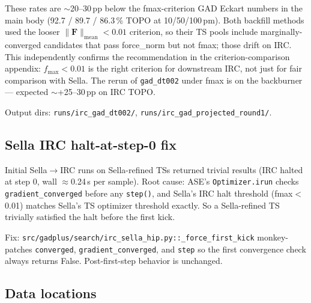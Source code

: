 \documentclass[11pt]{article}
\begin{document}
These rates are $\sim$20--30\,pp below the fmax-criterion GAD Eckart numbers
in the main body (92.7 / 89.7 / 86.3\,\% TOPO at 10/50/100\,pm). Both
backfill methods used the looser $\|\mathbf{F}\|_{\text{mean}}{<}0.01$
criterion, so their TS pools include marginally-converged candidates that
pass force\_norm but not fmax; those drift on IRC. This independently
confirms the recommendation in the criterion-comparison appendix:
$f_{\max}{<}0.01$ is the right criterion for downstream IRC, not just for
fair comparison with Sella. The rerun of \texttt{gad\_dt002} under fmax
is on the backburner --- expected $\sim$+25--30\,pp on IRC TOPO.

Output dirs: \texttt{runs/irc\_gad\_dt002/},
\texttt{runs/irc\_gad\_projected\_round1/}.

\clearpage
\subsection{Sella IRC halt-at-step-0 fix}

Initial Sella$\to$IRC runs on Sella-refined TSs returned trivial
results (IRC halted at step 0, wall $\approx$0.24\,s per sample). Root
cause: ASE's \texttt{Optimizer.irun} checks \texttt{gradient\_converged}
before any \texttt{step()}, and Sella's IRC halt threshold (fmax$<$0.01)
matches Sella's TS optimizer threshold exactly. So a Sella-refined TS
trivially satisfied the halt before the first kick.

Fix: \texttt{src/gadplus/search/irc\_sella\_hip.py::\_force\_first\_kick}
monkey-patches \texttt{converged}, \texttt{gradient\_converged}, and
\texttt{step} so the first convergence check always returns False.
Post-first-step behavior is unchanged.

\subsection{Data locations}
\end{document}
